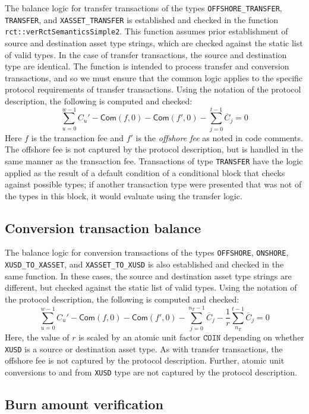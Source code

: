 \documentclass{article}
\newcommand{\func}[1]{\mathsf{#1}}
\begin{document}
The balance logic for transfer transactions of the types \texttt{OFFSHORE\_TRANSFER}, \texttt{TRANSFER}, and \texttt{XASSET\_TRANSFER} is established and checked in the function \texttt{rct::verRctSemanticsSimple2}.
This function assumes prior establishment of source and destination asset type strings, which are checked against the static list of valid types.
In the case of transfer transactions, the source and destination type are identical.
The function is intended to process transfer and conversion transactions, and so we must ensure that the common logic applies to the specific protocol requirements of transfer transactions.
Using the notation of the protocol description, the following is computed and checked:
$$\sum_{u=0}^{w-1} C_u' - \func{Com}(f,0) - \func{Com}(f',0) - \sum_{j=0}^{t-1} \overline{C}_j = 0$$
Here $f$ is the transaction fee and $f'$ is the \textit{offshore fee} as noted in code comments.
The offshore fee is not captured by the protocol description, but is handled in the same manner as the transaction fee.
Transactions of type \texttt{TRANSFER} have the logic applied as the result of a default condition of a conditional block that checks against possible types; if another transaction type were presented that was not of the types in this block, it would evaluate using the transfer logic.


\subsection{Conversion transaction balance}

The balance logic for conversion transactions of the types \texttt{OFFSHORE}, \texttt{ONSHORE}, \texttt{XUSD\_TO\_XASSET}, and \texttt{XASSET\_TO\_XUSD} is also established and checked in the same function.
In these cases, the source and destination asset type strings are different, but checked against the static list of valid types.
Using the notation of the protocol description, the following is computed and checked:
$$\sum_{u=0}^{w-1} C_u' - \func{Com}(f,0) - \func{Com}(f',0) - \sum_{j=0}^{n_T-1} \overline{C}_j - \frac{1}{r} \sum_{n_T}^{t-1} \overline{C}_j = 0$$
Here, the value of $r$ is scaled by an atomic unit factor $\texttt{COIN}$ depending on whether \texttt{XUSD} is a source or destination asset type.
As with transfer transactions, the offshore fee is not captured by the protocol description.
Further, atomic unit conversions to and from \texttt{XUSD} type are not captured by the protocol description.


\subsection{Burn amount verification}
\end{document}
